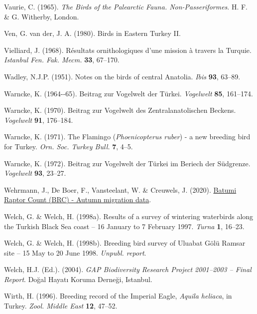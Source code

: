 \documentclass[
  a4paper,
  DIV=11,
  numbers=noendperiod]{scrreprt}
\newlength{\cslhangindent}
\newenvironment{CSLReferences}[2] %
 {\begin{list}{}{%
  \setlength{\itemindent}{0pt}
  \setlength{\leftmargin}{0pt}
  \setlength{\parsep}{0pt}
  \ifodd #1
   \setlength{\leftmargin}{\cslhangindent}
   \setlength{\itemindent}{-1\cslhangindent}
  \fi
  \setlength{\itemsep}{#2\baselineskip}}}
 {\end{list}}
\begin{document}
\begin{CSLReferences}{1}{1}
Vaurie, C. (1965). \emph{{The Birds of the Palearctic Fauna.
Non-Passeriformes}}. H. F. \& G. Witherby, London.

Ven, G. van der, J. A. (1980). {Birds in Eastern Turkey II}.

Vielliard, J. (1968). {Résultats ornithologiques d'une mission à travers
la Turquie}. \emph{Istanbul Fen. Fak. Mecm.} \textbf{33}, 67--170.

Wadley, N.J.P. (1951). {Notes on the birds of central Anatolia}.
\emph{Ibis} \textbf{93}, 63--89.

Warncke, K. (1964-\/-65). {Beitrag zur Vogelwelt der Türkei}.
\emph{Vogelwelt} \textbf{85}, 161--174.

Warncke, K. (1970). {Beitrag zur Vogelwelt des Zentralanatolischen
Beckens}. \emph{Vogelwelt} \textbf{91}, 176--184.

Warncke, K. (1971). {The Flamingo (\emph{Phoenicopterus ruber}) - a new
breeding bird for Turkey}. \emph{Orn. Soc. Turkey Bull.} \textbf{7},
4--5.

Warncke, K. (1972). {Beitrag zur Vogelwelt der Türkei im Beriech der
Südgrenze}. \emph{Vogelwelt} \textbf{93}, 23--27.

Wehrmann, J., De Boer, F., Vansteelant, W. \& Creuwels, J. (2020).
\href{https://doi.org/10.15468/UR0VNH}{{Batumi Raptor Count (BRC) -
Autumn migration data}}.

Welch, G. \& Welch, H. (1998a). {Results of a survey of wintering
waterbirds along the Turkish Black Sea coast -- 16 January to 7 February
1997}. \emph{Turna} \textbf{1}, 16--23.

Welch, G. \& Welch, H. (1998b). {Breeding bird survey of Uluabat Gölü
Ramsar site -- 15 May to 20 June 1998}. \emph{Unpubl. report}.

Welch, H.J. (Ed.). (2004). \emph{{GAP Biodiversity Research Project
2001--2003 -- Final Report}}. Doğal Hayatı Koruma Derneği, Istanbul.

Wirth, H. (1996). {Breeding record of the Imperial Eagle, \emph{Aquila
heliaca}, in Turkey}. \emph{Zool. Middle East} \textbf{12}, 47--52.


\end{CSLReferences}
\end{document}
